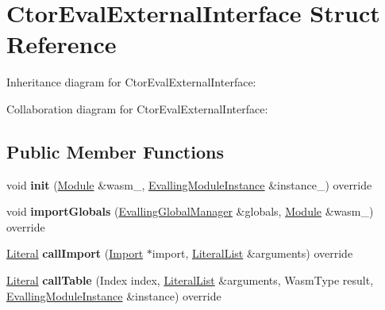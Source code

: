 \hypertarget{struct_ctor_eval_external_interface}{}\section{Ctor\+Eval\+External\+Interface Struct Reference}
\label{struct_ctor_eval_external_interface}


Inheritance diagram for Ctor\+Eval\+External\+Interface\+:


Collaboration diagram for Ctor\+Eval\+External\+Interface\+:
\subsection*{Public Member Functions}
\begin{DoxyCompactItemize}
\item 
\mbox{\label{struct_ctor_eval_external_interface_ad66cd3cf002640bb30e3202bca39aa09}} 
void {\bfseries init} (\mbox{\hyperlink{classwasm_1_1_module}{Module}} \&wasm\+\_\+, \mbox{\hyperlink{class_evalling_module_instance}{Evalling\+Module\+Instance}} \&instance\+\_\+) override
\item 
\mbox{\label{struct_ctor_eval_external_interface_a29c80b2021075fe434184a3d3c027928}} 
void {\bfseries import\+Globals} (\mbox{\hyperlink{class_evalling_global_manager}{Evalling\+Global\+Manager}} \&globals, \mbox{\hyperlink{classwasm_1_1_module}{Module}} \&wasm\+\_\+) override
\item 
\mbox{\label{struct_ctor_eval_external_interface_a0dc1dd90677d39a01367a8055f5b52d0}} 
\mbox{\hyperlink{classwasm_1_1_literal}{Literal}} {\bfseries call\+Import} (\mbox{\hyperlink{classwasm_1_1_import}{Import}} $\ast$import, \mbox{\hyperlink{classstd_1_1vector}{Literal\+List}} \&arguments) override
\item 
\mbox{\label{struct_ctor_eval_external_interface_a699a2c06419daa37c921a6ae9d57ce84}} 
\mbox{\hyperlink{classwasm_1_1_literal}{Literal}} {\bfseries call\+Table} (Index index, \mbox{\hyperlink{classstd_1_1vector}{Literal\+List}} \&arguments, Wasm\+Type result, \mbox{\hyperlink{class_evalling_module_instance}{Evalling\+Module\+Instance}} \&instance) override

\end{DoxyCompactItemize}
